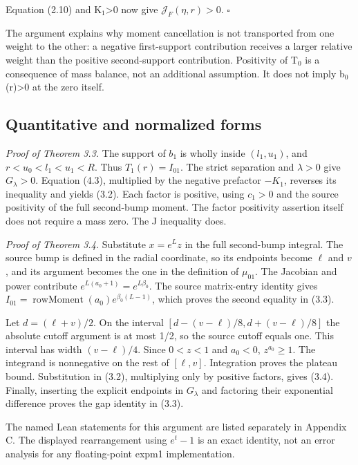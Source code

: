 \documentclass[11pt,a4paper]{article}
\begin{document}
Equation (2.10) and K\ensuremath{{}_1}>0 now give \(\mathcal J_F(\eta,r)>0\). \hfill\ensuremath{\square}

The argument explains why moment cancellation is not transported from one weight to the other: a negative first-support contribution receives a larger relative weight than the positive second-support contribution. Positivity of T\ensuremath{{}_0} is a consequence of mass balance, not an additional assumption. It does not imply b\ensuremath{{}_0}(r)>0 at the zero itself.


\subsection{Quantitative and normalized forms}

\emph{Proof of Theorem 3.3.} The support of \(b_1\) is wholly inside \((l_1,u_1)\), and \(r<u_0<l_1<u_1<R\). Thus \(T_1(r)=I_{01}\). The strict separation and \(\lambda>0\) give \(G_\lambda>0\). Equation (4.3), multiplied by the negative prefactor \(-K_1\),
reverses its inequality and yields (3.2). Each factor is positive, using
\(c_1>0\) and the source positivity of the full second-bump moment. The factor
positivity assertion itself does not require a mass zero. The J inequality does.

\emph{Proof of Theorem 3.4.} Substitute \(x=e^Lz\) in the full second-bump
integral. The source bump is defined in the radial coordinate, so its endpoints
become \(\ell\) and \(v\), and its argument becomes the one in the definition of \(\mu_{01}\).
The Jacobian and power contribute \(e^{L(a_0+1)}=e^{L\beta_0}\). The source
matrix-entry identity gives \(I_{01}=\operatorname{rowMoment}(a_0)e^{\beta_0(L-1)}\), which proves
the second equality in (3.3).

Let \(d=(\ell+v)/2\). On the interval \([d-(v-\ell)/8,d+(v-\ell)/8]\) the absolute
cutoff argument is at most 1/2, so the source cutoff equals one. This interval
has width \((v-\ell)/4\). Since \(0<z<1\) and \(a_0<0\), \(z^{a_0}\ge1\).
The integrand is nonnegative on the rest of \([\ell,v]\). Integration proves the
plateau bound. Substitution in (3.2), multiplying only by positive factors,
gives (3.4). Finally, inserting the explicit endpoints in \(G_\lambda\) and
factoring their exponential difference proves the gap identity in (3.3).

The named Lean statements for this argument are listed separately in Appendix C.
The displayed rearrangement using \(e^t-1\) is an exact identity, not an error
analysis for any floating-point expm1 implementation.
\end{document}
